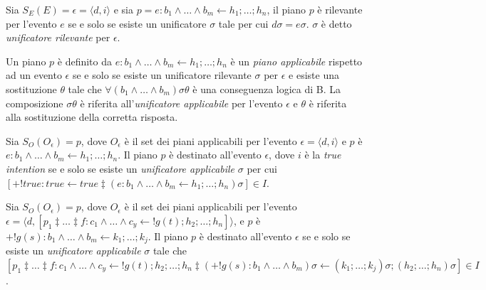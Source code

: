 \smallskip
\begin{defn}
Sia $S_E(E) = \epsilon = \langle d, i \rangle$ e sia $p = e : b_1 \land \ldots \land b_m \leftarrow h_1; \ldots; h_n$, il piano $p$ è rilevante per l'evento $e$ se e solo se esiste un unificatore $\sigma$ tale per cui $d\sigma = e\sigma$.
$\sigma$ è detto \textit{unificatore rilevante} per $\epsilon$.
\end{defn}

\smallskip
\begin{defn}
Un piano $p$ è definito da $e : b_1 \land \ldots \land b_m \leftarrow h_1; \ldots; h_n$ è un \textit{piano applicabile} rispetto ad un evento $\epsilon$ se e solo se esiste un unificatore rilevante $\sigma$ per $\epsilon$ e esiste una sostituzione $\theta$ tale che $\forall (b_1 \land \ldots \land b_m) \sigma\theta$ è una conseguenza logica di B. La composizione $\sigma\theta$ è riferita all'\textit{unificatore applicabile} per l'evento $\epsilon$ e $\theta$ è riferita alla sostituzione della corretta risposta.
\end{defn}

\smallskip
\begin{defn}
Sia $S_O(O_\epsilon) = p$, dove $O_\epsilon$ è il set dei piani applicabili per l'evento $\epsilon = \langle d, i \rangle$ e $p$ è $e : b_1 \land \ldots \land b_m \leftarrow h_1; \ldots; h_n$. Il piano $p$ è destinato all'evento $\epsilon$, dove $i$ è la \textit{true intention} se e solo se esiste un \textit{unificatore applicabile} $\sigma$ per cui $[+!true : true \leftarrow true \ddagger (e : b_1 \land \ldots \land b_m \leftarrow h_1; \ldots; h_n) \sigma] \in I$.
\end{defn}

\smallskip
\begin{defn}
Sia $S_O(O_\epsilon) = p$, dove $O_\epsilon$ è il set dei piani applicabili per l'evento $\epsilon = \langle d, [p_1 \ddagger \ldots \ddagger f : c_1 \land \ldots \land c_y \leftarrow !g(t); h_2; \ldots; h_n] \rangle$, e $p$ è $+!g(s) : b_1 \land \ldots \land b_m \leftarrow k_1; \ldots; k_j$. Il piano $p$ è destinato all'evento $\epsilon$ se e solo se esiste un \textit{unificatore applicabile} $\sigma$ tale che $[p_1 \ddagger \ldots \ddagger f : c_1 \land \ldots \land c_y \leftarrow !g(t); h_2; \ldots; h_n \ddagger (+!g(s) : b_1 \land \ldots \land b_m) \sigma \leftarrow (k_1; \ldots; k_j) \sigma; (h_2; \ldots; h_n) \sigma] \in I$.
\end{defn}

